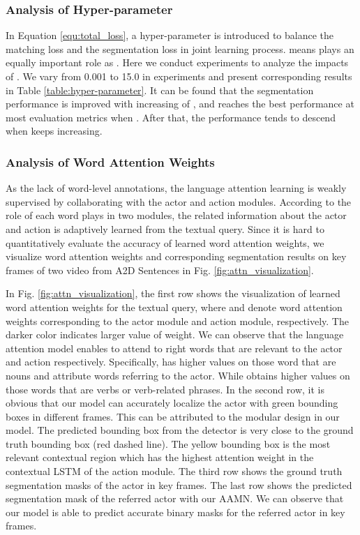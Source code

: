 \documentclass[journal]{IEEEtran}
\begin{document}
\subsubsection{Analysis of Hyper-parameter}
In Equation \ref{equ:total_loss}, a hyper-parameter  is introduced to balance the matching loss  and the segmentation loss  in joint learning process.  means  plays an equally important role as . Here we conduct experiments to analyze the impacts of . We vary  from 0.001 to 15.0 in experiments and present corresponding results in Table \ref{table:hyper-parameter}. It can be found that the segmentation performance is improved with increasing of , and reaches the best performance at most evaluation metrics when . After that, the performance tends to descend when  keeps increasing.


\subsubsection{Analysis of Word Attention Weights}
As the lack of word-level annotations, the language attention learning is weakly supervised by collaborating with the actor and action modules. According to the role of each word plays in two modules, the related information about the actor and action is adaptively learned from the textual query. Since it is hard to quantitatively evaluate the accuracy of learned word attention weights, we visualize word attention weights and corresponding segmentation results on key frames of two video from A2D Sentences in Fig. \ref{fig:attn_visualization}.

In Fig. \ref{fig:attn_visualization}, the first row shows the visualization of learned word attention weights for the textual query, where  and  denote word attention weights corresponding to the actor module and action module, respectively. The darker color indicates larger value of weight. We can observe that the language attention model enables to attend to right words that are relevant to the actor and action respectively. Specifically,  has higher values on those word that are nouns and attribute words referring to the actor. While  obtains higher values on those words that are verbs or verb-related phrases. In the second row, it is obvious that our model can accurately localize the actor with green bounding boxes in different frames. This can be attributed to the modular design in our model. The predicted bounding box from the detector is very close to the ground truth bounding box (red dashed line). The yellow bounding box is the most relevant contextual region which has the highest attention weight in the contextual LSTM of the action module. The third row shows the ground truth segmentation masks of the actor in key frames. The last row shows the predicted segmentation mask of the referred actor with our AAMN. We can observe that our model is able to predict accurate binary masks for the referred actor in key frames.
\end{document}
